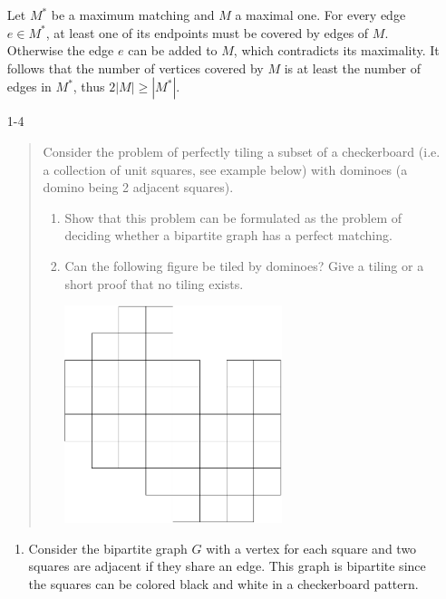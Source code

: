 \documentclass[12pt]{article}
\begin{document}
\begin{enumerate}
Let $M^*$ be a maximum matching and $M$ a maximal
  one. For every edge $e \in M^*$, at least one of its endpoints must
  be covered by edges of $M$. Otherwise the edge $e$ can be added to
  $M$, which contradicts its maximality. It follows that the number of
  vertices covered by $M$ is at least the number of edges in $M^*$,
  thus $2|M| \geq |M^*|$.

\item[1-4]
\begin{quote}
Consider the problem of perfectly tiling a subset of a checkerboard
  (i.e. a collection of unit squares, see example below) with dominoes
  (a domino being 2 adjacent squares).
\begin{enumerate}
\item
Show that this problem can be formulated as the problem of deciding
whether a bipartite graph has a perfect matching. 
\item 
Can the following figure be tiled by dominoes? Give a tiling or
  a short proof that no tiling exists.

\begin{center}
\includegraphics[height=2.5in]{../figures/domino}
\end{center}
\end{enumerate}
\end{quote}

\begin{enumerate}
\item Consider the bipartite graph $G$ with a vertex for each square
  and two squares are adjacent if they share an edge. This graph is
  bipartite since the squares can be colored black and white in a
  checkerboard pattern.


\end{enumerate}
\end{enumerate}
\end{document}
